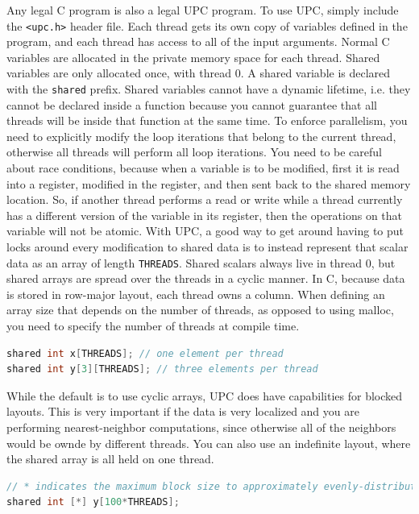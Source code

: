\documentclass[10pt]{article}
\begin{document}
\begin{flushleft}
Any legal C program is also a legal UPC program. To use UPC, simply include the {\tt <upc.h>} header file. Each thread gets its own copy of variables defined in the program, and each thread has access to all of the input arguments. Normal C variables are allocated in the private memory space for each thread. Shared variables are only allocated once, with thread 0. A shared variable is declared with the {\tt shared} prefix. Shared variables cannot have a dynamic lifetime, i.e. they cannot be declared inside a function because you cannot guarantee that all threads will be inside that function at the same time. To enforce parallelism, you need to explicitly modify the loop iterations that belong to the current thread, otherwise all threads will perform all loop iterations. You need to be careful about race conditions, because when a variable is to be modified, first it is read into a register, modified in the register, and then sent back to the shared memory location. So, if another thread performs a read or write while a thread currently has a different version of the variable in its register, then the operations on that variable will not be atomic. With UPC, a good way to get around having to put locks around every modification to shared data is to instead represent that scalar data as an array of length {\tt THREADS}. Shared scalars always live in thread 0, but shared arrays are spread over the threads in a cyclic manner. In C, because data is stored in row-major layout, each thread owns a column. When defining an array size that depends on the number of threads, as opposed to using malloc, you need to specify the number of threads at compile time. 

\begin{lstlisting}[language=C]
shared int x[THREADS]; // one element per thread
shared int y[3][THREADS]; // three elements per thread
\end{lstlisting}

While the default is to use cyclic arrays, UPC does have capabilities for blocked layouts. This is very important if the data is very localized and you are performing nearest-neighbor computations, since otherwise all of the neighbors would be ownde by different threads. You can also use an indefinite layout, where the shared array is all held on one thread. 

\begin{lstlisting}[language=C]
// * indicates the maximum block size to approximately evenly-distribute the elements
shared int [*] y[100*THREADS];


\end{lstlisting}
\end{flushleft}
\end{document}
